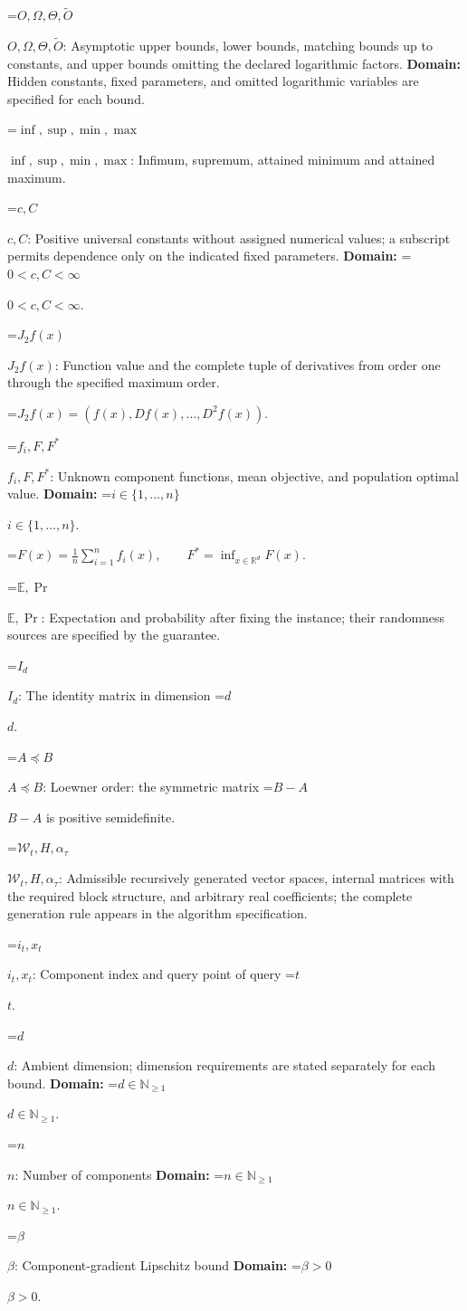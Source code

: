 \documentclass[10pt,a4paper]{article}
\newcommand{\AtlasMath}[1]{\par\begingroup\centering\setbox0=\hbox{$\displaystyle #1$}\ifdim\wd0>1.4\linewidth\typeout{ATLAS WIDE FORMULA: \the\wd0}\fi\ifdim\wd0>\linewidth\resizebox{\linewidth}{!}{\box0}\else\box0\fi\par\endgroup}
\newcommand{\AtlasInlineMath}[1]{\begingroup\setbox0=\hbox{$#1$}\ifdim\wd0>.4\linewidth\endgroup\AtlasMath{#1}\else\endgroup$#1$\fi}
\begin{document}
\AtlasInlineMath{O,\Omega,\Theta,\widetilde{O}}: Asymptotic upper bounds, lower bounds, matching bounds up to constants, and upper bounds omitting the declared logarithmic factors. \textbf{Domain:} Hidden constants, fixed parameters, and omitted logarithmic variables are specified for each bound.

\AtlasInlineMath{\inf,\sup,\min,\max}: Infimum, supremum, attained minimum and attained maximum.

\AtlasInlineMath{c,C}: Positive universal constants without assigned numerical values; a subscript permits dependence only on the indicated fixed parameters. \textbf{Domain:} \AtlasInlineMath{0<c,C<\infty}.

\AtlasInlineMath{J_{2}f(x)}: Function value and the complete tuple of derivatives from order one through the specified maximum order.


\AtlasMath{J_{2}f(x)=(f(x),Df(x),\ldots,D^{2}f(x)).}


\AtlasInlineMath{f_i,F,F^*}: Unknown component functions, mean objective, and population optimal value. \textbf{Domain:} \AtlasInlineMath{i\in\{1,\ldots,n\}}.


\AtlasMath{F(x)=\frac1n\sum_{i=1}^nf_i(x),\qquad F^*=\inf_{x\in\mathbb{R}^d}F(x).}


\AtlasInlineMath{\mathbb{E},\Pr}: Expectation and probability after fixing the instance; their randomness sources are specified by the guarantee.

\AtlasInlineMath{I_d}: The identity matrix in dimension \AtlasInlineMath{d}.

\AtlasInlineMath{A\preceq B}: Loewner order: the symmetric matrix \AtlasInlineMath{B-A} is positive semidefinite.

\AtlasInlineMath{\mathcal{W}_t,H,\alpha_\tau}: Admissible recursively generated vector spaces, internal matrices with the required block structure, and arbitrary real coefficients; the complete generation rule appears in the algorithm specification.

\AtlasInlineMath{i_t,x_t}: Component index and query point of query \AtlasInlineMath{t}.

\AtlasInlineMath{d}: Ambient dimension; dimension requirements are stated separately for each bound. \textbf{Domain:} \AtlasInlineMath{d\in\mathbb{N}_{\ge 1}}.

\AtlasInlineMath{n}: Number of components \textbf{Domain:} \AtlasInlineMath{n\in\mathbb{N}_{\ge 1}}.

\AtlasInlineMath{\beta}: Component-gradient Lipschitz bound \textbf{Domain:} \AtlasInlineMath{\beta>0}.
\end{document}

